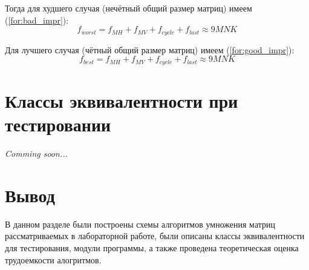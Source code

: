 Тогда для худшего случая (нечётный общий размер матриц) имеем (\ref{for:bad_impr}):
\begin{equation}
	\label{for:bad_impr}
	f_{worst} = f_{MH} + f_{MV} + f_{cycle} + f_{last} \approx 9MNK
\end{equation}

Для лучшего случая (чётный общий размер матриц) имеем (\ref{for:good_impr}):
\begin{equation}
	\label{for:good_impr}
	f_{best} = f_{MH} + f_{MV} + f_{cycle} + f_{last} \approx 9MNK
\end{equation}


\section{Классы эквивалентности при тестировании}

\textit{Comming soon...}




\section{Вывод}

В данном разделе были построены схемы алгоритмов умножения матриц рассматриваемых в лабораторной работе, были описаны классы эквивалентности для тестирования, модули программы, а также проведена теоретическая оценка трудоемкости алогритмов.
